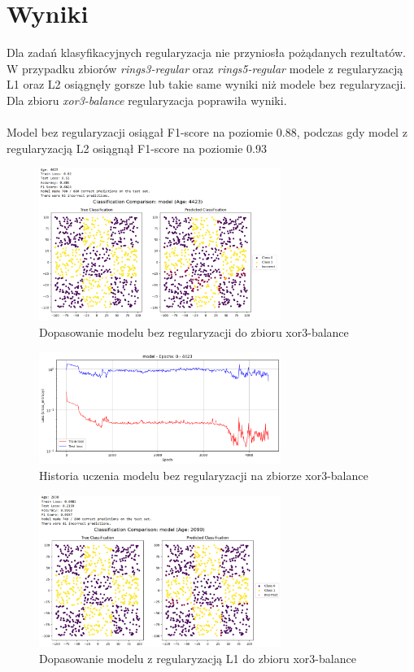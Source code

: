 \documentclass{article}
\begin{document}
\section*{Wyniki}

Dla zadań klasyfikacyjnych regularyzacja nie przyniosła pożądanych rezultatów. W przypadku zbiorów \textit{rings3-regular} oraz \textit{rings5-regular} modele z regularyzacją L1 oraz L2 osiągnęły gorsze lub takie same wyniki niż modele bez regularyzacji. Dla zbioru \textit{xor3-balance} regularyzacja poprawiła wyniki. \\
\\
Model bez regularyzacji osiągał F1-score na poziomie 0.88, podczas gdy model z regularyzacją L2 osiągnął F1-score na poziomie 0.93

\begin{figure}[H]
    \centering
    \includegraphics[width=0.7\textwidth]{img/nn6/xor_noreg.png}
    \caption{Dopasowanie modelu bez regularyzacji do zbioru xor3-balance}
\end{figure}

\begin{figure}[H]
    \centering
    \includegraphics[width=0.7\textwidth]{img/nn6/xor_noreg_hist.png}
    \caption{Historia uczenia modelu bez regularyzacji na zbiorze xor3-balance}
\end{figure}

\begin{figure}[H]
    \centering
    \includegraphics[width=0.7\textwidth]{img/nn6/xor_reg.png}
    \caption{Dopasowanie modelu z regularyzacją L1 do zbioru xor3-balance}
\end{figure}
\end{document}
